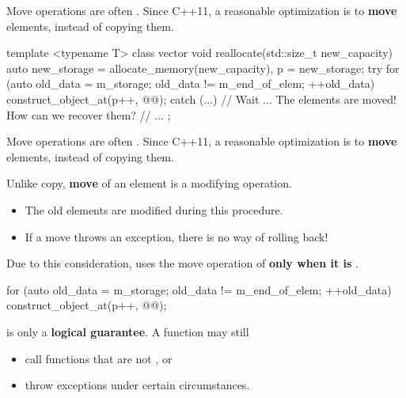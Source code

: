 \documentclass[aspectratio=169]{beamer}
\begin{document}
\begin{frame}[fragile]{Move operations are often .}
  Since C++11, a reasonable optimization is to \textbf{move} elements, instead of copying them.
  \begin{cpp}
    template <typename T>
    class vector {
      void reallocate(std::size_t new_capacity) {
        auto new_storage = allocate_memory(new_capacity), p = new_storage;
        try {
          for (auto old_data = m_storage; old_data != m_end_of_elem; ++old_data)
            construct_object_at(p++, @@);
        } catch (...) {
          // Wait ... The elements are moved! How can we recover them?
        }
        // ...
      }
    };
  \end{cpp}
\end{frame}

\begin{frame}[fragile]{Move operations are often .}
  Since C++11, a reasonable optimization is to \textbf{move} elements, instead of copying them.

  Unlike copy, \textbf{move} of an element is a modifying operation.
  \begin{itemize}
    \item The old elements are modified during this procedure.
    \item If a move throws an exception, there is no way of rolling back!
  \end{itemize}

  Due to this consideration,  uses the move operation of  \textbf{only when it is }.
  \begin{cpp}
    for (auto old_data = m_storage; old_data != m_end_of_elem; ++old_data)
      construct_object_at(p++, @@);
  \end{cpp}
\end{frame}

\begin{frame}{}
   is only a \textbf{logical guarantee}. A  function may still
  \begin{itemize}
    \item call functions that are not , or
    \item throw exceptions under certain circumstances.
  \end{itemize}
\end{frame}
\end{document}
